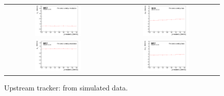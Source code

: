 \begin{figure}
  \begin{center}
    \begin{tabular}{cc}
      \includegraphics[width=0.45\textwidth]{upstream_p_resolution_p_logo.png} &	
      \includegraphics[width=0.45\textwidth]{upstream_p_bias_p_logo.png} \\
      \includegraphics[width=0.45\textwidth]{upstream_pt_resolution_p_logo.png} &
      \includegraphics[width=0.45\textwidth]{upstream_pt_bias_p_logo.png}
    \end{tabular}
  \end{center}
  \caption{
    Upstream tracker: from simulated data.
  }
  \label{trackers:performance:resolutions:up}
\end{figure}
